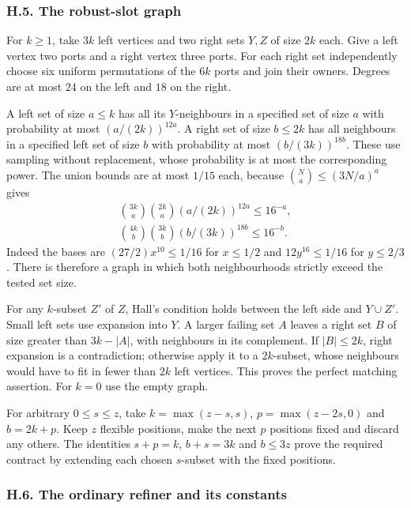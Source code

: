\documentclass[english,11pt,a4paper]{article}
\begin{document}
\subsubsection{H.5. The robust-slot graph}\label{h.5.-the-robust-slot-graph}

For \(k\ge1\), take \(3k\) left vertices and two right sets \(Y,Z\) of size \(2k\) each. Give a left vertex two ports and a right vertex three ports. For each right set independently choose six uniform permutations of the \(6k\) ports and join their owners. Degrees are at most \(24\) on the left and \(18\) on the right.

A left set of size \(a\le k\) has all its \(Y\)-neighbours in a specified set of size \(a\) with probability at most \((a/(2k))^{12a}\). A right set of size \(b\le2k\) has all neighbours in a specified left set of size \(b\) with probability at most \((b/(3k))^{18b}\). These use sampling without replacement, whose probability is at most the corresponding power. The union bounds are at most \(1/15\) each, because \(\binom Na\le(3N/a)^a\) gives \[\begin{gathered}
\binom{3k}{a}\binom{2k}{a}(a/(2k))^{12a}\le16^{-a},\\
\binom{4k}{b}\binom{3k}{b}(b/(3k))^{18b}\le16^{-b}.
\end{gathered}\] Indeed the bases are \((27/2)x^{10}\le1/16\) for \(x\le1/2\) and \(12y^{16}\le1/16\) for \(y\le2/3\). There is therefore a graph in which both neighbourhoods strictly exceed the tested set size.

For any \(k\)-subset \(Z'\) of \(Z\), Hall's condition holds between the left side and \(Y\cup Z'\). Small left sets use expansion into \(Y\). A larger failing set \(A\) leaves a right set \(B\) of size greater than \(3k-|A|\), with neighbours in its complement. If \(|B|\le2k\), right expansion is a contradiction; otherwise apply it to a \(2k\)-subset, whose neighbours would have to fit in fewer than \(2k\) left vertices. This proves the perfect matching assertion. For \(k=0\) use the empty graph.

For arbitrary \(0\le s\le z\), take \(k=\max(z-s,s)\), \(p=\max(z-2s,0)\) and \(b=2k+p\). Keep \(z\) flexible positions, make the next \(p\) positions fixed and discard any others. The identities \(s+p=k\), \(b+s=3k\) and \(b\le3z\) prove the required contract by extending each chosen \(s\)-subset with the fixed positions.

\subsubsection{H.6. The ordinary refiner and its constants}\label{h.6.-the-ordinary-refiner-and-its-constants}
\end{document}
